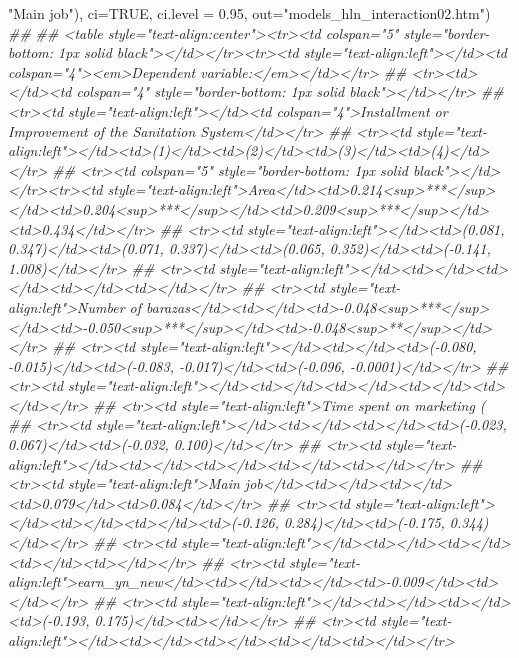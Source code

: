 \documentclass[
]{article}
\newenvironment{Shaded}{\begin{snugshade}}{\end{snugshade}}
\newcommand{\CommentTok}[1]{\textcolor[rgb]{0.56,0.35,0.01}{\textit{#1}}}
\newcommand{\DataTypeTok}[1]{\textcolor[rgb]{0.13,0.29,0.53}{#1}}
\newcommand{\FloatTok}[1]{\textcolor[rgb]{0.00,0.00,0.81}{#1}}
\newcommand{\NormalTok}[1]{#1}
\newcommand{\OtherTok}[1]{\textcolor[rgb]{0.56,0.35,0.01}{#1}}
\newcommand{\StringTok}[1]{\textcolor[rgb]{0.31,0.60,0.02}{#1}}
\begin{document}
\begin{Shaded}
\begin{Highlighting}[]
{{{{{{{{{{{{{{{{{{{                             \StringTok{"Main job"}\NormalTok{), }\DataTypeTok{ci=}\OtherTok{TRUE}\NormalTok{, }\DataTypeTok{ci.level =} \FloatTok{0.95}\NormalTok{, }\DataTypeTok{out=}\StringTok{"models_hln_interaction02.htm"}\NormalTok{)}
\CommentTok{## }
\CommentTok{## <table style="text-align:center"><tr><td colspan="5" style="border-bottom: 1px solid black"></td></tr><tr><td style="text-align:left"></td><td colspan="4"><em>Dependent variable:</em></td></tr>}
\CommentTok{## <tr><td></td><td colspan="4" style="border-bottom: 1px solid black"></td></tr>}
\CommentTok{## <tr><td style="text-align:left"></td><td colspan="4">Installment or Improvement of the Sanitation System</td></tr>}
\CommentTok{## <tr><td style="text-align:left"></td><td>(1)</td><td>(2)</td><td>(3)</td><td>(4)</td></tr>}
\CommentTok{## <tr><td colspan="5" style="border-bottom: 1px solid black"></td></tr><tr><td style="text-align:left">Area</td><td>0.214<sup>***</sup></td><td>0.204<sup>***</sup></td><td>0.209<sup>***</sup></td><td>0.434</td></tr>}
\CommentTok{## <tr><td style="text-align:left"></td><td>(0.081, 0.347)</td><td>(0.071, 0.337)</td><td>(0.065, 0.352)</td><td>(-0.141, 1.008)</td></tr>}
\CommentTok{## <tr><td style="text-align:left"></td><td></td><td></td><td></td><td></td></tr>}
\CommentTok{## <tr><td style="text-align:left">Number of barazas</td><td></td><td>-0.048<sup>***</sup></td><td>-0.050<sup>***</sup></td><td>-0.048<sup>**</sup></td></tr>}
\CommentTok{## <tr><td style="text-align:left"></td><td></td><td>(-0.080, -0.015)</td><td>(-0.083, -0.017)</td><td>(-0.096, -0.0001)</td></tr>}
\CommentTok{## <tr><td style="text-align:left"></td><td></td><td></td><td></td><td></td></tr>}
\CommentTok{## <tr><td style="text-align:left">Time spent on marketing (%)</td><td></td><td></td><td>0.022</td><td>0.034</td></tr>}
\CommentTok{## <tr><td style="text-align:left"></td><td></td><td></td><td>(-0.023, 0.067)</td><td>(-0.032, 0.100)</td></tr>}
\CommentTok{## <tr><td style="text-align:left"></td><td></td><td></td><td></td><td></td></tr>}
\CommentTok{## <tr><td style="text-align:left">Main job</td><td></td><td></td><td>0.079</td><td>0.084</td></tr>}
\CommentTok{## <tr><td style="text-align:left"></td><td></td><td></td><td>(-0.126, 0.284)</td><td>(-0.175, 0.344)</td></tr>}
\CommentTok{## <tr><td style="text-align:left"></td><td></td><td></td><td></td><td></td></tr>}
\CommentTok{## <tr><td style="text-align:left">earn_yn_new</td><td></td><td></td><td>-0.009</td><td></td></tr>}
\CommentTok{## <tr><td style="text-align:left"></td><td></td><td></td><td>(-0.193, 0.175)</td><td></td></tr>}
\CommentTok{## <tr><td style="text-align:left"></td><td></td><td></td><td></td><td></td></tr>}
}}}}}}}}}}}}}}}}}}}}
\end{Highlighting}
\end{Shaded}
\end{document}

